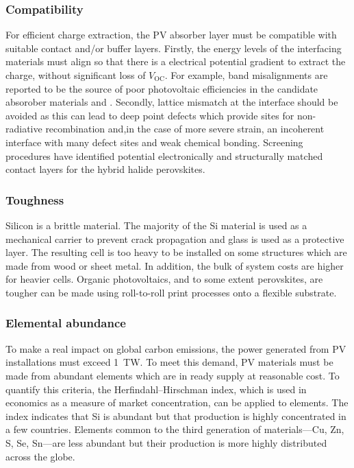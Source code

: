 \subsubsection{Compatibility}
For efficient charge extraction, the PV absorber layer must be compatible with suitable contact and/or buffer layers. Firstly, the energy levels of the interfacing materials must align so that there is a electrical potential gradient to extract the charge, without significant loss of $V_\textrm{OC}$. For example, band misalignments are reported to be the source of poor photovoltaic efficiencies in the candidate absorober materials  and .\autocite{Ganose2016} Secondly, lattice mismatch at the interface should be avoided as this can lead to deep point defects which provide sites for non-radiative recombination and,in the case of more severe strain, an incoherent interface with many defect sites and weak chemical bonding. Screening procedures have identified potential electronically and structurally matched contact layers for the hybrid halide perovskites.\autocite{Butler2016}

\subsubsection{Toughness}
Silicon is a brittle material. The majority of the Si material is used as a mechanical carrier to prevent crack propagation and glass is used as a protective layer. The resulting cell is too heavy to be installed on some structures which are made from wood or sheet metal. In addition, the bulk of system costs are higher for heavier cells. Organic photovoltaics, and to some extent perovskites, are tougher can be made using roll-to-roll print processes onto a flexible substrate.

\subsubsection{Elemental abundance}
To make a real impact on global carbon emissions, the power generated from PV installations must exceed \SI{1}{TW}.\autocite{Battersby2019} To meet this demand, PV materials must be made from abundant elements which are in ready supply at reasonable cost. To quantify this criteria, the Herfindahl–Hirschman index, which is used in economics as a measure of market concentration, can be applied to elements. The index indicates that Si is abundant but that production is highly concentrated in a few countries. Elements common to the third generation of materials---Cu, Zn, S, Se, Sn---are less abundant but their production is more highly distributed across the globe.\autocite{Gaultois2013}

